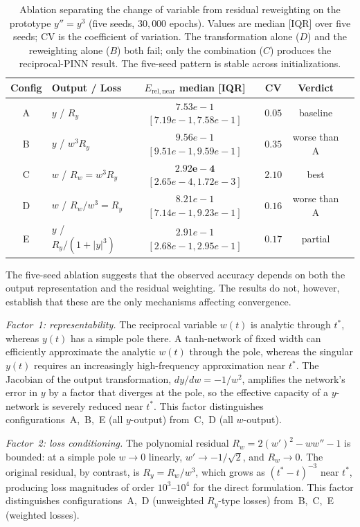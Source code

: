 \documentclass[a4paper, 10pt]{article}
\theoremstyle{definition}
\begin{document}
\begin{table}[t]
\centering
\caption{Ablation separating the change of variable from residual reweighting on the prototype $y''=y^3$ (five seeds, $30{,}000$ epochs). Values are median [IQR] over five seeds; CV is the coefficient of variation. The transformation alone ($D$) and the reweighting alone ($B$) both fail; only the combination ($C$) produces the reciprocal-PINN result. The five-seed pattern is stable across initializations.}
\label{tab:M1}
\begin{tabular}{clcccc}
\toprule
Config & Output / Loss & $E_{\mathrm{rel,near}}$ median [IQR] & CV & Verdict \\
\midrule
A & $y$ / $R_y$ & $7.53e-1$ $[7.19e-1, 7.58e-1]$ & $0.05$ & baseline \\
B & $y$ / $w^3 R_y$ & $9.56e-1$ $[9.51e-1, 9.59e-1]$ & $0.35$ & worse than A \\
C & $w$ / $R_w = w^3 R_y$ & $\mathbf{2.92e-4}$ $[2.65e-4, 1.72e-3]$ & $2.10$ & best \\
D & $w$ / $R_w/w^3 = R_y$ & $8.21e-1$ $[7.14e-1, 9.23e-1]$ & $0.16$ & worse than A \\
E & $y$ / $R_y/(1+|y|^3)$ & $2.91e-1$ $[2.68e-1, 2.95e-1]$ & $0.17$ & partial \\
\bottomrule
\end{tabular}
\end{table}

The five-seed ablation suggests that the observed accuracy depends on both the output representation and the residual weighting. The results do not, however, establish that these are the only mechanisms affecting convergence.

\emph{Factor~1: representability.} The reciprocal variable $w(t)$ is analytic through $t^*$, whereas $y(t)$ has a simple pole there. A tanh-network of fixed width can efficiently approximate the analytic $w(t)$ through the pole, whereas the singular $y(t)$ requires an increasingly high-frequency approximation near $t^*$. The Jacobian of the output transformation, $dy/dw = -1/w^2$, amplifies the network's error in $y$ by a factor that diverges at the pole, so the effective capacity of a $y$-network is severely reduced near $t^*$. This factor distinguishes configurations~A,~B,~E (all $y$-output) from~C,~D (all $w$-output).

\emph{Factor~2: loss conditioning.} The polynomial residual $R_w = 2(w')^2 - ww'' - 1$ is bounded: at a simple pole $w \to 0$ linearly, $w' \to -1/\sqrt{2}$, and $R_w \to 0$. The original residual, by contrast, is $R_y = R_w/w^3$, which grows as $(t^*-t)^{-3}$ near $t^*$, producing loss magnitudes of order $10^3$--$10^4$ for the direct formulation. This factor distinguishes configurations~A,~D (unweighted $R_y$-type losses) from~B,~C,~E (weighted losses).
\end{document}
